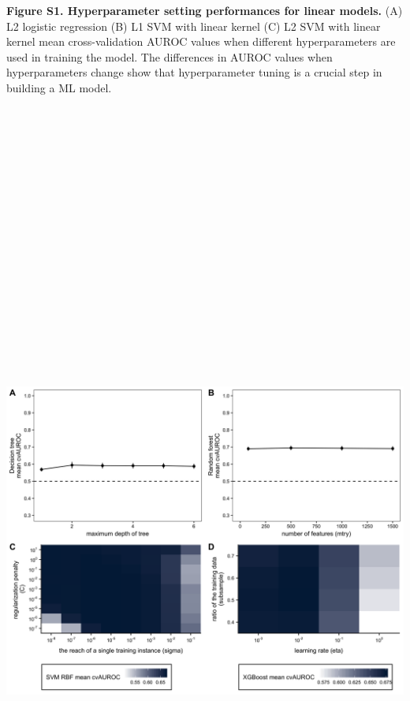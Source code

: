 \documentclass[11pt,]{article}
\begin{document}
\textbf{Figure S1. Hyperparameter setting performances for linear
models.} (A) L2 logistic regression (B) L1 SVM with linear kernel (C) L2
SVM with linear kernel mean cross-validation AUROC values when different
hyperparameters are used in training the model. The differences in AUROC
values when hyperparameters change show that hyperparameter tuning is a
crucial step in building a ML model.

\newpage

\includegraphics[height=30cm, width=15cm]{Figure_S2.png}
\end{document}
